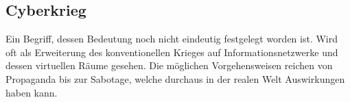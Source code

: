 	\subsection{Cyberkrieg}
	  Ein Begriff, dessen Bedeutung noch nicht eindeutig festgelegt worden 
	  ist. Wird oft als Erweiterung des konventionellen Krieges auf 
	  Informationsnetzwerke und dessen virtuellen Räume gesehen. Die 
	  möglichen Vorgehensweisen reichen von Propaganda bis zur Sabotage, 
	  welche durchaus in der realen Welt Auswirkungen haben kann. 
